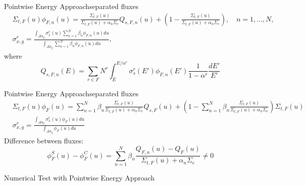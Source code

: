 \documentclass[sans,mathserif,aspectratio=169, 10pt]{beamer}
\begin{document}
\begin{frame}{Pointwise Energy Approach}{separated fluxes}
\begin{align}
&\Sigma_{t,F} (u) \phi_{F,n} (u) = \frac{\Sigma_{t,F} (u)}{\Sigma_{t,F} (u) + \alpha_n \Sigma_e} Q_{s,F,n} (u) + \left( 1 - \frac{\Sigma_{t,F} (u)}{\Sigma_{t,F} (u) + \alpha_n \Sigma_e} \right), \quad n = 1, \dots, N, \\
&\sigma_{x,g}^r = \frac{\int_{\Delta u_g} \sigma_x^r (u) \sum_{n=1}^N \beta_n \phi_{F,n} (u) du}{\int_{\Delta u_g}  \sum_{n=1}^N \beta_n \phi_{F,n} (u) du},
\end{align}
where
\begin{equation}
Q_{s,F,n} (E) = \sum_{r \in F} N^r \int_E^{E/\alpha^r} \sigma_s^r (E') \phi_{F,n} (E') \frac{1}{1-\alpha^r} \frac{dE'}{E'}
\end{equation}
\end{frame}

\begin{frame}{Pointwise Energy Approach}{separated fluxes}
\begin{align}
&\Sigma_{t,F} (u) \phi_F (u) = \sum_{n=1}^N \beta_n \frac{\Sigma_{t,F}(u)}{\Sigma_{t,F}(u) + \alpha_n \Sigma_e} Q_{s,F} (u) + \left( 1- \sum_{n=1}^N \beta_n \frac{\Sigma_{t,F}(u)}{\Sigma_{t,F}(u) + \alpha_n \Sigma_e} \right) \Sigma_{t,F} (u) \\
&\sigma_{x,g}^r = \frac{\int_{\Delta u_g} \sigma_x^r (u) \phi_F (u) du}{\int_{\Delta u_g} \phi_F (u) du}
\end{align}
Difference between fluxes:
\begin{equation}
\phi_F^S (u) - \phi_F^C (u) = \sum_{n=1}^N \beta_n \frac{Q_{F,n} (u) - Q_F (u)}{\Sigma_{t,F} (u) + \alpha_n \Sigma_e} \ne 0
\end{equation}
\end{frame}

\begin{frame}{Numerical Test with Pointwise Energy Approach}
\centering
{}
\end{frame}
\end{document}
